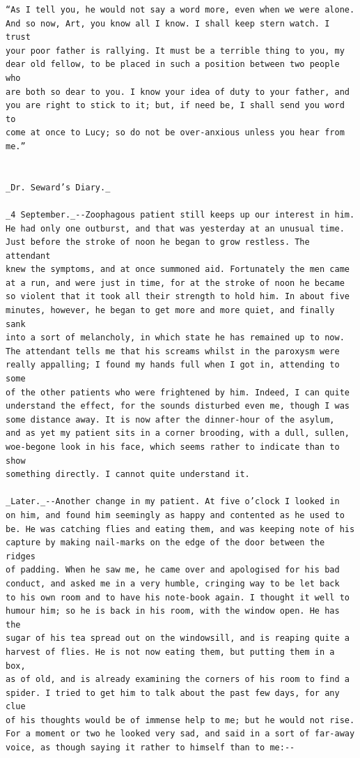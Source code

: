 \documentclass{article}
\begin{document}
\begin{verbatim}
“As I tell you, he would not say a word more, even when we were alone.
And so now, Art, you know all I know. I shall keep stern watch. I trust
your poor father is rallying. It must be a terrible thing to you, my
dear old fellow, to be placed in such a position between two people who
are both so dear to you. I know your idea of duty to your father, and
you are right to stick to it; but, if need be, I shall send you word to
come at once to Lucy; so do not be over-anxious unless you hear from
me.”


_Dr. Seward’s Diary._

_4 September._--Zoophagous patient still keeps up our interest in him.
He had only one outburst, and that was yesterday at an unusual time.
Just before the stroke of noon he began to grow restless. The attendant
knew the symptoms, and at once summoned aid. Fortunately the men came
at a run, and were just in time, for at the stroke of noon he became
so violent that it took all their strength to hold him. In about five
minutes, however, he began to get more and more quiet, and finally sank
into a sort of melancholy, in which state he has remained up to now.
The attendant tells me that his screams whilst in the paroxysm were
really appalling; I found my hands full when I got in, attending to some
of the other patients who were frightened by him. Indeed, I can quite
understand the effect, for the sounds disturbed even me, though I was
some distance away. It is now after the dinner-hour of the asylum,
and as yet my patient sits in a corner brooding, with a dull, sullen,
woe-begone look in his face, which seems rather to indicate than to show
something directly. I cannot quite understand it.

_Later._--Another change in my patient. At five o’clock I looked in
on him, and found him seemingly as happy and contented as he used to
be. He was catching flies and eating them, and was keeping note of his
capture by making nail-marks on the edge of the door between the ridges
of padding. When he saw me, he came over and apologised for his bad
conduct, and asked me in a very humble, cringing way to be let back
to his own room and to have his note-book again. I thought it well to
humour him; so he is back in his room, with the window open. He has the
sugar of his tea spread out on the windowsill, and is reaping quite a
harvest of flies. He is not now eating them, but putting them in a box,
as of old, and is already examining the corners of his room to find a
spider. I tried to get him to talk about the past few days, for any clue
of his thoughts would be of immense help to me; but he would not rise.
For a moment or two he looked very sad, and said in a sort of far-away
voice, as though saying it rather to himself than to me:--


\end{verbatim}
\end{document}
